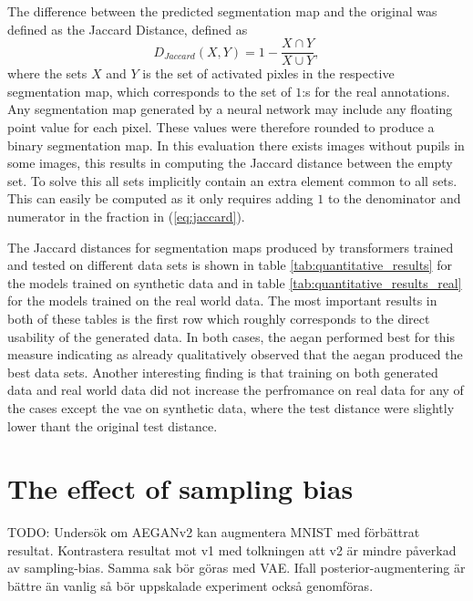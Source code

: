 The difference between the predicted segmentation map and the original was defined as the Jaccard Distance, defined as
\begin{equation}
    D_{Jaccard}(X, Y) = 1 - \frac{X \cap Y}{X \cup Y},
    \label{eq:jaccard}
\end{equation}
where the sets $X$ and $Y$ is the set of activated pixles in the respective segmentation map, which corresponds to the set of $1$:s for the real annotations. Any segmentation map generated by a neural network may include any floating point value for each pixel. These values were therefore rounded to produce a binary segmentation map. In this evaluation there exists images without pupils in some images, this results in computing the Jaccard distance between the empty set. To solve this all sets implicitly contain an extra element common to all sets. This can easily be computed as it only requires adding $1$ to the denominator and numerator in the fraction in (\ref{eq:jaccard}).

The Jaccard distances for segmentation maps produced by transformers trained and tested on different data sets is shown in table \ref{tab:quantitative_results} for the models trained on synthetic data and in table \ref{tab:quantitative_results_real} for the models trained on the real world data. The most important results in both of these tables is the first row which roughly corresponds to the direct usability of the generated data. In both cases, the \acrshort{aegan} performed best for this measure indicating as already qualitatively observed that the \acrshort{aegan} produced the best data sets. Another interesting finding is that training on both generated data and real world data did not increase the perfromance on real data for any of the cases except the \acrshort{vae} on synthetic data, where the test distance were slightly lower thant the original test distance.

\section{The effect of sampling bias}  %
TODO: Undersök om AEGANv2 kan augmentera MNIST med förbättrat resultat. Kontrastera resultat mot v1 med tolkningen att v2 är mindre påverkad av sampling-bias. Samma sak bör göras med VAE. Ifall posterior-augmentering är bättre än vanlig så bör uppskalade experiment också genomföras.


